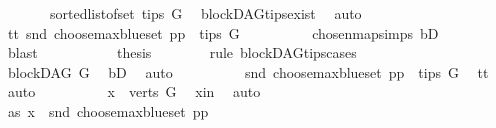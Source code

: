\begin{isabellebody}
\ \ \ \ \ \ \ {\isacharparenleft}{\kern0pt}sorted{\isacharunderscore}{\kern0pt}list{\isacharunderscore}{\kern0pt}of{\isacharunderscore}{\kern0pt}set\ {\isacharparenleft}{\kern0pt}tips\ G{\isacharparenright}{\kern0pt}{\isacharparenright}{\kern0pt}{\isacharparenright}{\kern0pt}{\isachardoublequoteclose}\ \isamarkupfalse%
\ blockDAG{\isachardot}{\kern0pt}tips{\isacharunderscore}{\kern0pt}exist\ \isamarkupfalse%
\ auto\isanewline
\ \ \ \ \ \ \isamarkupfalse%
\ \isamarkupfalse%
\ tt{}{\isacharcolon}{\kern0pt}\ {\isachardoublequoteopen}snd\ {\isacharparenleft}{\kern0pt}choose{\isacharunderscore}{\kern0pt}max{\isacharunderscore}{\kern0pt}blue{\isacharunderscore}{\kern0pt}set\ pp{\isacharparenright}{\kern0pt}\ {\isasymin}\ tips\ G{\isachardoublequoteclose}\isanewline
\ \ \ \ \ \ \ \ \isamarkupfalse%
\ chosen{\isacharunderscore}{\kern0pt}map{\isacharunderscore}{\kern0pt}simps\ bD\isanewline
\ \ \ \ \ \ \ \ \isamarkupfalse%
\ blast\ \ \ \isanewline
\ \ \ \ \ \ \isamarkupfalse%
\ {\isacharquery}{\kern0pt}thesis\ \isanewline
\ \ \ \ \ \ \isamarkupfalse%
{\isacharparenleft}{\kern0pt}rule\ blockDAG{\isachardot}{\kern0pt}tips{\isacharunderscore}{\kern0pt}cases{\isacharparenright}{\kern0pt}\isanewline
\ \ \ \ \ \ \ \ \isamarkupfalse%
\ {\isachardoublequoteopen}blockDAG\ G{\isachardoublequoteclose}\ \isamarkupfalse%
\ bD\ \isamarkupfalse%
\ auto\isanewline
\ \ \ \ \ \ \ \ \isamarkupfalse%
\ {\isachardoublequoteopen}snd\ {\isacharparenleft}{\kern0pt}choose{\isacharunderscore}{\kern0pt}max{\isacharunderscore}{\kern0pt}blue{\isacharunderscore}{\kern0pt}set\ pp{\isacharparenright}{\kern0pt}\ {\isasymin}\ tips\ G{\isachardoublequoteclose}\ \isamarkupfalse%
\ tt{}\ \isamarkupfalse%
\ auto\isanewline
\ \ \ \ \ \ \ \ \isamarkupfalse%
\ {\isachardoublequoteopen}x\ {\isasymin}\ verts\ G{\isachardoublequoteclose}\ \isamarkupfalse%
\ x{\isacharunderscore}{\kern0pt}in\ \isamarkupfalse%
\ auto\isanewline
\ \ \ \ \ \ \isamarkupfalse%
\ \ \isanewline
\ \ \ \ \ \ \ \ \isamarkupfalse%
\ as{}{\isacharcolon}{\kern0pt}\ {\isachardoublequoteopen}x\ {\isacharequal}{\kern0pt}\ snd\ {\isacharparenleft}{\kern0pt}choose{\isacharunderscore}{\kern0pt}max{\isacharunderscore}{\kern0pt}blue{\isacharunderscore}{\kern0pt}set\ pp{\isacharparenright}{\kern0pt}{\isachardoublequoteclose}\isanewline

\end{isabellebody}
